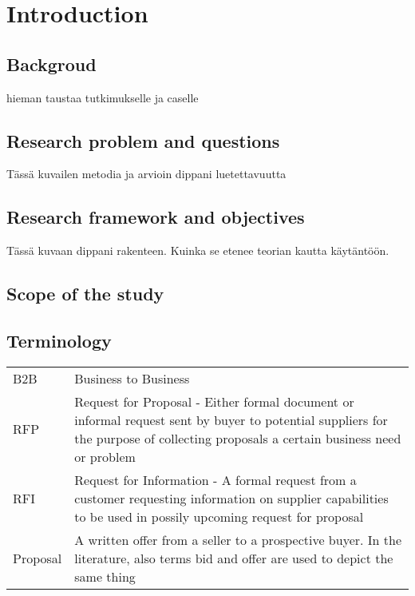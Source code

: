\documentclass[12pt,a4paper,oneside,pdftex]{report}
\begin{document}
\pagestyle{headings}


% 

\chapter{Introduction}
\label{chapter:intro}






\section{Backgroud}

hieman taustaa tutkimukselle ja caselle

\section{Research problem and questions}
\label{section:constructive}

Tässä kuvailen metodia ja arvioin dippani luetettavuutta

\section{Research framework and objectives}
\label{section:structure}

Tässä kuvaan dippani rakenteen. Kuinka se etenee teorian kautta käytäntöön. 

\section{Scope of the study}
\label{section:structure}

\section{Terminology}
\label{section:Terminology}


\noindent
\begin{longtable}{@{}p{}p{}@{}}
B2B & Business to Business \\
RFP & Request for Proposal - Either formal document or informal request sent by buyer to potential suppliers for the purpose of collecting proposals a certain business need or problem \\
RFI & Request for Information - A formal request from a customer requesting information on supplier capabilities to be used in possily upcoming request for proposal \\
Proposal  & A written offer from a seller to a prospective buyer. In the literature, also terms bid and offer are used to depict the same thing \\

\end{longtable}
\end{document}
